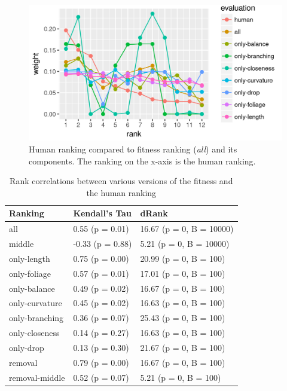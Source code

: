 \begin{figure}
    \centering
    \includegraphics[width=1.0\textwidth]{figures/fitcmp-only}
    \caption[Human ranking compared to fitness ranking and its components]{Human ranking compared to fitness ranking (\textit{all}) and its components. The ranking on the x-axis is the human ranking.}
    \label{fig:fitcmp-only}
\end{figure}

\begin{table}
    \centering
    \begin{tabular}{| l | l | l |}
    \hline
    \textbf{Ranking} & \textbf{Kendall's Tau} & \textbf{dRank} \\
    \hline
                all & 0.55 (p = 0.01)  & 16.67 (p = 0, B = 10000) \\
             middle & -0.33 (p = 0.88) & 5.21 (p = 0, B = 10000) \\
        only-length & 0.75 (p = 0.00)  & 20.99 (p = 0, B = 100) \\
       only-foliage & 0.57 (p = 0.01)  & 17.01 (p = 0, B = 100) \\
       only-balance & 0.49 (p = 0.02)  & 16.67 (p = 0, B = 100) \\
     only-curvature & 0.45 (p = 0.02)  & 16.63 (p = 0, B = 100) \\
     only-branching & 0.36 (p = 0.07)  & 25.43 (p = 0, B = 100) \\
     only-closeness & 0.14 (p = 0.27)  & 16.63 (p = 0, B = 100) \\
          only-drop & 0.13 (p = 0.30)  & 21.67 (p = 0, B = 100) \\
            removal & 0.79 (p = 0.00)  & 16.67 (p = 0, B = 100) \\
     removal-middle & 0.52 (p = 0.07)  & 5.21 (p = 0, B = 100) \\
    \hline
    \end{tabular}
    \caption{Rank correlations between various versions of the fitness and the human ranking}
    \label{tab:rankstats}
\end{table}

